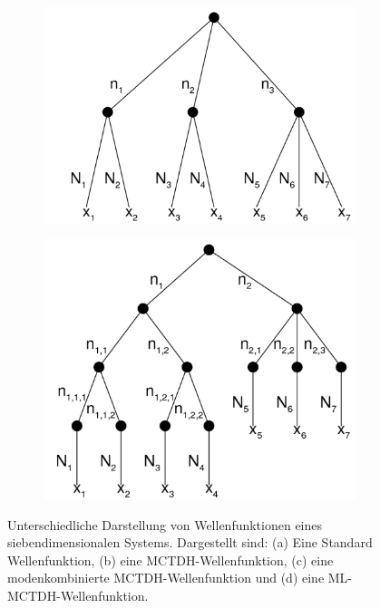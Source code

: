 \begin{figure}
\begin{minipage}{0.45\textwidth}
    \begin{subfigure}{\textwidth}
        \caption{}\label{fig:rightC}
        \includegraphics[width=\textwidth]{figures/mctdh_wave2}
    \end{subfigure}
    \quad
    \begin{subfigure}{\textwidth}
        \caption{}\label{fig:rightD}
        \includegraphics[width=\textwidth]{figures/multi_mctdh_wave}
    \end{subfigure}
\end{minipage}
  \caption{Unterschiedliche Darstellung von Wellenfunktionen eines siebendimensionalen Systems. Dargestellt sind: (a) Eine Standard Wellenfunktion,
  (b) eine MCTDH-Wellenfunktion, (c) eine modenkombinierte MCTDH-Wellenfunktion und (d) eine ML-MCTDH-Wellenfunktion.}\label{fig:tree}
\end{figure}



